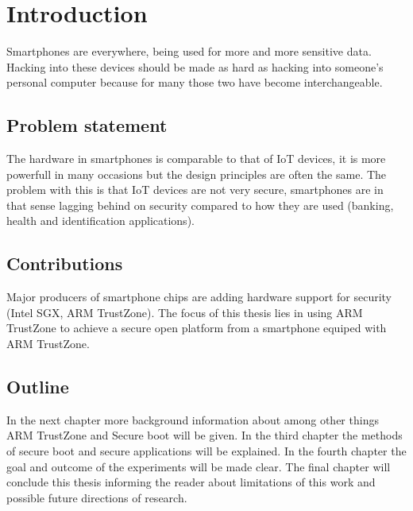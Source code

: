 \documentclass{report}
\begin{document}
\chapter{Introduction}

Smartphones are everywhere, being used for more and more sensitive data. Hacking into these devices should be made as hard as hacking into someone's personal computer because for many those two have become interchangeable.

\section{Problem statement}

The hardware in smartphones is comparable to that of IoT devices, it is more powerfull in many occasions but the design principles are often the same. The problem with this is that IoT devices are not very secure, smartphones are in that sense lagging behind on security compared to how they are used (banking, health and identification applications).

\section{Contributions}

Major producers of smartphone chips are adding hardware support for security (Intel SGX, ARM TrustZone). The focus of this thesis lies in using ARM TrustZone to achieve a secure open platform from a smartphone equiped with ARM TrustZone.

\section{Outline}

In the next chapter more background information about among other things ARM TrustZone and Secure boot will be given. In the third chapter the methods of secure boot and secure applications will be explained. In the fourth chapter the goal and outcome of the experiments will be made clear. The final chapter will conclude this thesis informing the reader about limitations of this work and possible future directions of research.
\end{document}
